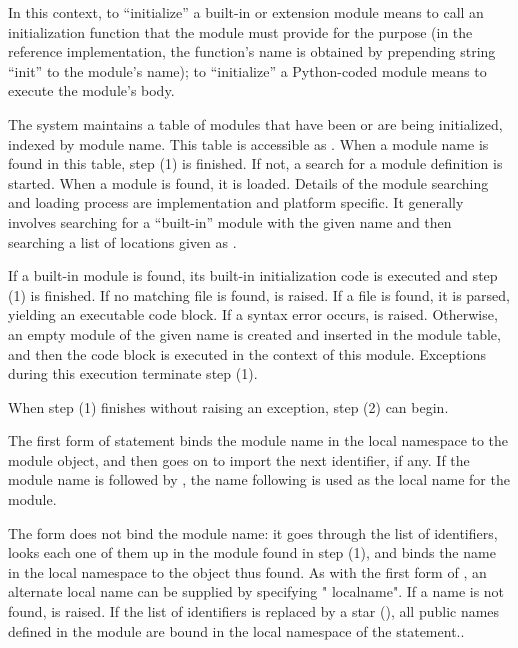 In this context, to ``initialize'' a built-in or extension module means to
call an initialization function that the module must provide for the purpose
(in the reference implementation, the function's name is obtained by
prepending string ``init'' to the module's name); to ``initialize'' a
Python-coded module means to execute the module's body.
  
The system maintains a table of modules that have been or are being
initialized,
indexed by module name.  This table is
accessible as .  When a module name is found in
this table, step (1) is finished.  If not, a search for a module
definition is started.  When a module is found, it is loaded.  Details
of the module searching and loading process are implementation and
platform specific.  It generally involves searching for a ``built-in''
module with the given name and then searching a list of locations
given as .

If a built-in module is found, its built-in initialization code is
executed and step (1) is finished.  If no matching file is found,
 is raised.  If a file is found, it is parsed,
yielding an executable code block.  If a syntax error occurs,
 is raised.  Otherwise, an empty module of the given
name is created and inserted in the module table, and then the code
block is executed in the context of this module.  Exceptions during
this execution terminate step (1).

When step (1) finishes without raising an exception, step (2) can
begin.

The first form of  statement binds the module name in
the local namespace to the module object, and then goes on to import
the next identifier, if any.  If the module name is followed by
, the name following  is used as the local
name for the module. 

The  form does not bind the module name: it goes through the
list of identifiers, looks each one of them up in the module found in step
(1), and binds the name in the local namespace to the object thus found. 
As with the first form of , an alternate local name can be
supplied by specifying " localname".  If a name is not found,
 is raised.  If the list of identifiers is replaced
by a star (\character{*}), all public names defined in the module are
bound in the local namespace of the  statement..

